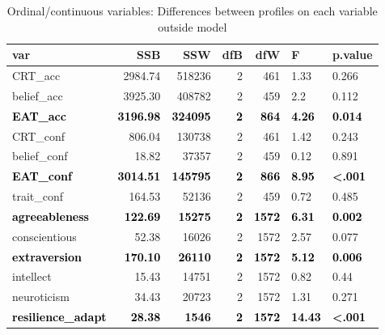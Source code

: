 \documentclass[]{article}
\begin{document}
\begin{table}[H]

\caption{\label{tab:unnamed-chunk-17}Ordinal/continuous variables: Differences between profiles on each variable outside model}
\centering
\fontsize{6}{8}\selectfont
\begin{tabular}[t]{lrrrrll}
\toprule
var & SSB & SSW & dfB & dfW & F & p.value\\
\midrule
CRT\_acc & 2984.74 & 518236 & 2 & 461 & 1.33 & 0.266\\
belief\_acc & 3925.30 & 408782 & 2 & 459 & 2.2 & 0.112\\
\textcolor{black}{\textbf{EAT\_acc}} & \textcolor{black}{\textbf{3196.98}} & \textcolor{black}{\textbf{324095}} & \textcolor{black}{\textbf{2}} & \textcolor{black}{\textbf{864}} & \textcolor{black}{\textbf{4.26}} & \textcolor{black}{\textbf{0.014}}\\
CRT\_conf & 806.04 & 130738 & 2 & 461 & 1.42 & 0.243\\
belief\_conf & 18.82 & 37357 & 2 & 459 & 0.12 & 0.891\\
\addlinespace
\textcolor{black}{\textbf{EAT\_conf}} & \textcolor{black}{\textbf{3014.51}} & \textcolor{black}{\textbf{145795}} & \textcolor{black}{\textbf{2}} & \textcolor{black}{\textbf{866}} & \textcolor{black}{\textbf{8.95}} & \textcolor{black}{\textbf{<.001}}\\
trait\_conf & 164.53 & 52136 & 2 & 459 & 0.72 & 0.485\\
\textcolor{black}{\textbf{agreeableness}} & \textcolor{black}{\textbf{122.69}} & \textcolor{black}{\textbf{15275}} & \textcolor{black}{\textbf{2}} & \textcolor{black}{\textbf{1572}} & \textcolor{black}{\textbf{6.31}} & \textcolor{black}{\textbf{0.002}}\\
conscientious & 52.38 & 16026 & 2 & 1572 & 2.57 & 0.077\\
\textcolor{black}{\textbf{extraversion}} & \textcolor{black}{\textbf{170.10}} & \textcolor{black}{\textbf{26110}} & \textcolor{black}{\textbf{2}} & \textcolor{black}{\textbf{1572}} & \textcolor{black}{\textbf{5.12}} & \textcolor{black}{\textbf{0.006}}\\
\addlinespace
intellect & 15.43 & 14751 & 2 & 1572 & 0.82 & 0.44\\
neuroticism & 34.43 & 20723 & 2 & 1572 & 1.31 & 0.271\\
\textcolor{black}{\textbf{resilience\_adapt}} & \textcolor{black}{\textbf{28.38}} & \textcolor{black}{\textbf{1546}} & \textcolor{black}{\textbf{2}} & \textcolor{black}{\textbf{1572}} & \textcolor{black}{\textbf{14.43}} & \textcolor{black}{\textbf{<.001}}\\

\end{tabular}
\end{table}
\end{document}
